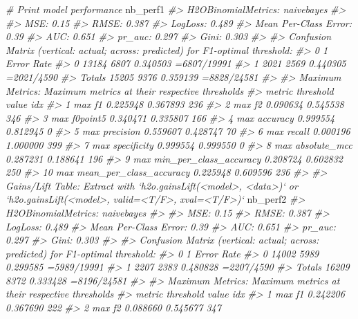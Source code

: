 \documentclass[]{book}
\newenvironment{Shaded}{\begin{snugshade}}{\end{snugshade}}
\newcommand{\CommentTok}[1]{\textcolor[rgb]{0.56,0.35,0.01}{\textit{#1}}}
\newcommand{\NormalTok}[1]{#1}
\begin{document}
\begin{Shaded}
\begin{Highlighting}[]
{{{\CommentTok{# Print model performance}
\NormalTok{nb_perf1}
\CommentTok{#> H2OBinomialMetrics: naivebayes}
\CommentTok{#> }
\CommentTok{#> MSE:  0.15}
\CommentTok{#> RMSE:  0.387}
\CommentTok{#> LogLoss:  0.489}
\CommentTok{#> Mean Per-Class Error:  0.39}
\CommentTok{#> AUC:  0.651}
\CommentTok{#> pr_auc:  0.297}
\CommentTok{#> Gini:  0.303}
\CommentTok{#> }
\CommentTok{#> Confusion Matrix (vertical: actual; across: predicted) for F1-optimal threshold:}
\CommentTok{#>            0    1    Error         Rate}
\CommentTok{#> 0      13184 6807 0.340503  =6807/19991}
\CommentTok{#> 1       2021 2569 0.440305   =2021/4590}
\CommentTok{#> Totals 15205 9376 0.359139  =8828/24581}
\CommentTok{#> }
\CommentTok{#> Maximum Metrics: Maximum metrics at their respective thresholds}
\CommentTok{#>                         metric threshold    value idx}
\CommentTok{#> 1                       max f1  0.225948 0.367893 236}
\CommentTok{#> 2                       max f2  0.090634 0.545538 346}
\CommentTok{#> 3                 max f0point5  0.340471 0.335807 166}
\CommentTok{#> 4                 max accuracy  0.999554 0.812945   0}
\CommentTok{#> 5                max precision  0.559607 0.428747  70}
\CommentTok{#> 6                   max recall  0.000196 1.000000 399}
\CommentTok{#> 7              max specificity  0.999554 0.999550   0}
\CommentTok{#> 8             max absolute_mcc  0.287231 0.188641 196}
\CommentTok{#> 9   max min_per_class_accuracy  0.208724 0.602832 250}
\CommentTok{#> 10 max mean_per_class_accuracy  0.225948 0.609596 236}
\CommentTok{#> }
\CommentTok{#> Gains/Lift Table: Extract with `h2o.gainsLift(<model>, <data>)` or `h2o.gainsLift(<model>, valid=<T/F>, xval=<T/F>)`}
\NormalTok{nb_perf2}
\CommentTok{#> H2OBinomialMetrics: naivebayes}
\CommentTok{#> }
\CommentTok{#> MSE:  0.15}
\CommentTok{#> RMSE:  0.387}
\CommentTok{#> LogLoss:  0.489}
\CommentTok{#> Mean Per-Class Error:  0.39}
\CommentTok{#> AUC:  0.651}
\CommentTok{#> pr_auc:  0.297}
\CommentTok{#> Gini:  0.303}
\CommentTok{#> }
\CommentTok{#> Confusion Matrix (vertical: actual; across: predicted) for F1-optimal threshold:}
\CommentTok{#>            0    1    Error         Rate}
\CommentTok{#> 0      14002 5989 0.299585  =5989/19991}
\CommentTok{#> 1       2207 2383 0.480828   =2207/4590}
\CommentTok{#> Totals 16209 8372 0.333428  =8196/24581}
\CommentTok{#> }
\CommentTok{#> Maximum Metrics: Maximum metrics at their respective thresholds}
\CommentTok{#>                         metric threshold    value idx}
\CommentTok{#> 1                       max f1  0.242206 0.367690 222}
\CommentTok{#> 2                       max f2  0.088660 0.545677 347}
}}}
\end{Highlighting}
\end{Shaded}
\end{document}
